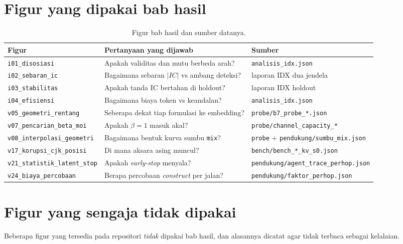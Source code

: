 \documentclass{laporanta1statugm}
\newcommand{\code}[1]{\texttt{#1}}
\begin{document}
\section{Figur yang dipakai bab hasil}

\begin{table}[htbp]
\centering
\caption{Figur bab hasil dan sumber datanya.}
\label{tab:figur}
\small
\begin{tabular}{lll}
\hline
Figur & Pertanyaan yang dijawab & Sumber \\
\hline
\code{i01\_disosiasi} & Apakah validitas dan mutu berbeda arah? &
  \code{analisis\_idx.json} \\
\code{i02\_sebaran\_ic} & Bagaimana sebaran $|IC|$ vs ambang deteksi? &
  laporan IDX dua jendela \\
\code{i03\_stabilitas} & Apakah tanda IC bertahan di holdout? &
  laporan IDX holdout \\
\code{i04\_efisiensi} & Bagaimana biaya token vs keandalan? &
  \code{analisis\_idx.json} \\
\code{v05\_geometri\_rentang} & Seberapa dekat tiap formulasi ke embedding? &
  \code{probe/b7\_probe\_*.json} \\
\code{v07\_pencarian\_beta\_moi} & Apakah $\beta=1$ masuk akal? &
  \code{probe/channel\_capacity\_*} \\
\code{v08\_interpolasi\_geometri} & Bagaimana bentuk kurva sumbu \code{mix}? &
  \code{probe} + \code{pendukung/sumbu\_mix.json} \\
\code{v17\_korupsi\_cjk\_posisi} & Di mana aksara asing muncul? &
  \code{bench/bench\_*\_kv\_s0.json} \\
\code{v21\_statistik\_latent\_stop} & Apakah \textit{early-stop} menyala? &
  \code{pendukung/agent\_trace\_perhop.json} \\
\code{v24\_biaya\_percobaan} & Berapa percobaan \textit{construct} per jalan? &
  \code{pendukung/faktor\_perhop.json} \\
\hline
\end{tabular}
\end{table}

\section{Figur yang sengaja tidak dipakai}

Beberapa figur yang tersedia pada repositori \emph{tidak} dipakai bab hasil,
dan alasannya dicatat agar tidak terbaca sebagai kelalaian.
\end{document}
